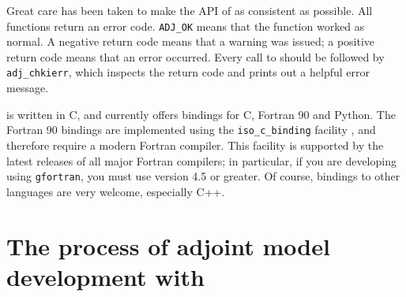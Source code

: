 Great care has been taken to make the API of \libadjoint as consistent as possible. All functions
return an error code. \texttt{ADJ\_OK} means that the function worked as normal. A negative
return code means that a warning was issued; a positive return code means that an error occurred.
Every call to \libadjoint should be followed by \texttt{adj\_chkierr}, which inspects the return
code and prints out a helpful error message.

\libadjoint is written in C, and currently offers bindings for C, Fortran 90 and Python. The Fortran 90 bindings
are implemented using the \texttt{iso\_c\_binding} facility \citep{metcalf2004}, and therefore require a modern
Fortran compiler. This facility is supported by the latest releases of all major Fortran compilers; in particular,
if you are developing using \texttt{gfortran}, you must use version 4.5 or greater.
Of course, bindings to other languages are very welcome, especially C++.

\section{The process of adjoint model development with \libadjoint}
